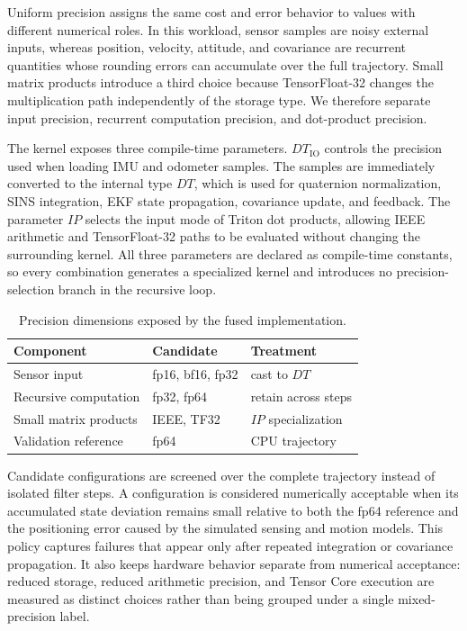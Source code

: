 \documentclass[research]{fcs}
\begin{document}
Uniform precision assigns the same cost and error behavior to values with different numerical roles. In this workload, sensor samples are noisy external inputs, whereas position, velocity, attitude, and covariance are recurrent quantities whose rounding errors can accumulate over the full trajectory. Small matrix products introduce a third choice because TensorFloat-32 changes the multiplication path independently of the storage type. We therefore separate input precision, recurrent computation precision, and dot-product precision.

The kernel exposes three compile-time parameters. $\mathit{DT}_{\mathrm{IO}}$ controls the precision used when loading IMU and odometer samples. The samples are immediately converted to the internal type $\mathit{DT}$, which is used for quaternion normalization, SINS integration, EKF state propagation, covariance update, and feedback. The parameter $\mathit{IP}$ selects the input mode of Triton dot products, allowing IEEE arithmetic and TensorFloat-32 paths to be evaluated without changing the surrounding kernel. All three parameters are declared as compile-time constants, so every combination generates a specialized kernel and introduces no precision-selection branch in the recursive loop.

\begin{table}[!t]
  \centering
  \caption{Precision dimensions exposed by the fused implementation.}
  \label{tab:precision-design}
  \begin{tabular}{@{}lll@{}}
    \toprule
    Component & Candidate & Treatment \\
    \midrule
    Sensor input & fp16, bf16, fp32 & cast to $\mathit{DT}$ \\
    Recursive computation & fp32, fp64 & retain across steps \\
    Small matrix products & IEEE, TF32 & $\mathit{IP}$ specialization \\
    Validation reference & fp64 & CPU trajectory \\
    \bottomrule
  \end{tabular}
\end{table}

Candidate configurations are screened over the complete trajectory instead of isolated filter steps. A configuration is considered numerically acceptable when its accumulated state deviation remains small relative to both the fp64 reference and the positioning error caused by the simulated sensing and motion models. This policy captures failures that appear only after repeated integration or covariance propagation. It also keeps hardware behavior separate from numerical acceptance: reduced storage, reduced arithmetic precision, and Tensor Core execution are measured as distinct choices rather than being grouped under a single mixed-precision label.
\end{document}

